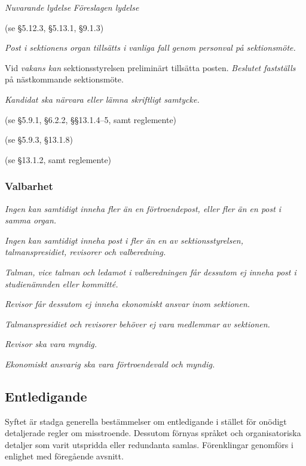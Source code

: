 \documentclass{article}
\newenvironment{lydelse}
    {\begin{paracol}{2}%
        \emph{Nuvarande lydelse}%
        \switchcolumn%
        \emph{Föreslagen lydelse}%
    \end{paracol}%
    \begin{enumerate}[label=\thesubsection.\arabic*]%
    \begin{paracol}{2}%
    }{\end{paracol}\end{enumerate}}
\begin{document}
\begin{lydelse}
    (se \S 5.12.3, \S 5.13.1, \S 9.1.3)
  \switchcolumn
    \item \emph{Post i sektionens organ tillsätts i vanliga fall genom personval på sektionsmöte.} \label{4.x:tillsätt}

    \item Vid \emph{vakans kan} sektionsstyrelsen preliminärt tillsätta posten.
      \emph{Beslutet fastställs} på nästkommande sektionsmöte. \label{4.x:styretval}

    \item \emph{Kandidat ska närvara eller lämna skriftligt samtycke.} \label{4.x:samtycke}

  \switchcolumn*
    \item[] (se \S 5.9.1, \S 6.2.2, \S\S 13.1.4--5, samt reglemente)
    \item[] (se \S 5.9.3, \S 13.1.8)
    \item[] (se \S 13.1.2, samt reglemente)
    \switchcolumn  
    \subsubsection*{Valbarhet}
    \item \emph{Ingen kan samtidigt inneha fler än en förtroendepost, eller fler än en post i samma organ.}

    \item \emph{Ingen kan samtidigt inneha post i fler än en av sektionsstyrelsen, talmanspresidiet, revisorer och valberedning.} \label{4.x:valbar.dubbel}

    \item \emph{Talman, vice talman och ledamot i valberedningen får dessutom ej inneha post i studienämnden eller kommitté.} \label{4.x:valbar.ober}

    \item \emph{Revisor får dessutom ej inneha ekonomiskt ansvar inom sektionen.}
      
    \item \emph{Talmanspresidiet och revisorer behöver ej vara medlemmar av sektionen.}

    \item \emph{Revisor ska vara myndig.} \label{4.x:valbar.revisormyndig}
      
    \item \emph{Ekonomiskt ansvarig ska vara förtroendevald och myndig.}
\end{lydelse}

\subsection{Entledigande}
Syftet är stadga generella bestämmelser om entledigande i stället för onödigt detaljerade regler om misstroende.
Dessutom förnyas språket och organisatoriska detaljer som varit utspridda eller redundanta samlas.
Förenklingar genomförs i enlighet med föregående avsnitt.
\end{document}
